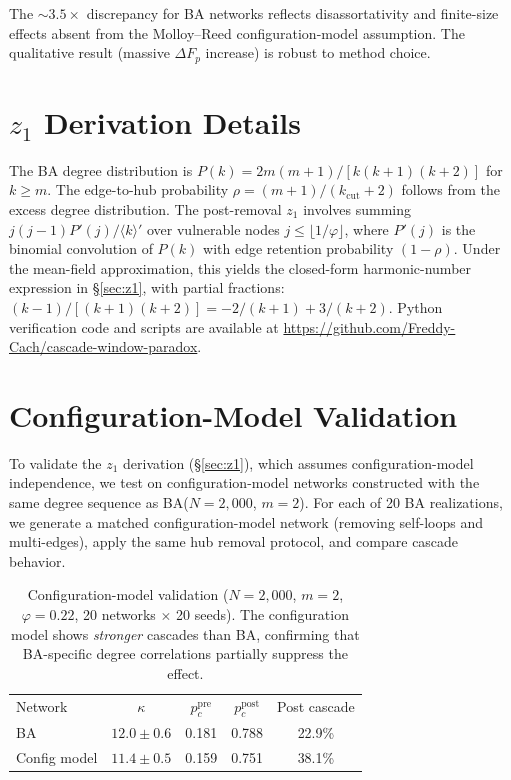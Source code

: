 \documentclass[aps,pre,twocolumn,superscriptaddress,showpacs]{revtex4-2}
\newcommand{\avg}[1]{\langle #1 \rangle}
\newcommand{\pc}{p_c}
\newcommand{\DF}{\Delta F}
\newcommand{\kcut}{k_{\text{cut}}}
\begin{document}
The ${\sim}3.5\times$ discrepancy for BA networks reflects disassortativity and finite-size effects absent from the Molloy--Reed configuration-model assumption. The qualitative result (massive $\DF_p$ increase) is robust to method choice.

\section{$z_1$ Derivation Details}
\label{app:z1}

The BA degree distribution is $P(k) = 2m(m+1)/[k(k+1)(k+2)]$ for $k \geq m$. The edge-to-hub probability $\rho = (m+1)/(\kcut+2)$ follows from the excess degree distribution. The post-removal $z_1$ involves summing $j(j-1)P'(j)/\avg{k}'$ over vulnerable nodes $j \leq \lfloor 1/\varphi \rfloor$, where $P'(j)$ is the binomial convolution of $P(k)$ with edge retention probability $(1-\rho)$. Under the mean-field approximation, this yields the closed-form harmonic-number expression in \S\ref{sec:z1}, with partial fractions: $(k-1)/[(k+1)(k+2)] = -2/(k+1) + 3/(k+2)$. Python verification code and scripts are available at \url{https://github.com/Freddy-Cach/cascade-window-paradox}.

\section{Configuration-Model Validation}
\label{app:config}

To validate the $z_1$ derivation (\S\ref{sec:z1}), which assumes configuration-model independence, we test on configuration-model networks constructed with the same degree sequence as BA($N=2{,}000$, $m=2$). For each of 20 BA realizations, we generate a matched configuration-model network (removing self-loops and multi-edges), apply the same hub removal protocol, and compare cascade behavior.

\begin{table}[h]
\caption{Configuration-model validation ($N=2{,}000$, $m=2$, $\varphi=0.22$, 20 networks $\times$ 20 seeds). The configuration model shows \emph{stronger} cascades than BA, confirming that BA-specific degree correlations partially suppress the effect.}
\label{tab:config}
\begin{ruledtabular}
\begin{tabular}{lcccc}
\textrm{Network} & $\kappa$ & $\pc^{\mathrm{pre}}$ & $\pc^{\mathrm{post}}$ & \textrm{Post cascade} \\
\colrule
BA & $12.0 \pm 0.6$ & 0.181 & 0.788 & 22.9\% \\
Config model & $11.4 \pm 0.5$ & 0.159 & 0.751 & 38.1\% \\
\end{tabular}
\end{ruledtabular}
\end{table}
\end{document}
